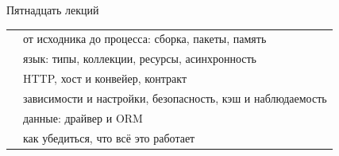 \documentclass[aspectratio=169,10pt,t]{beamer}
\begin{document}
\begin{frame}{Пятнадцать лекций}
  \slidetop

  {\renewcommand{\arraystretch}{1.3}
  \begin{tabular}{@{}L{2.6cm}L{10.2cm}@{}}
       & от исходника до процесса: сборка, пакеты, память \\
       & язык: типы, коллекции, ресурсы, асинхронность \\
       & HTTP, хост и конвейер, контракт \\
     & зависимости и настройки, безопасность, кэш и
      наблюдаемость \\
     & данные: драйвер и ORM \\
          & как убедиться, что всё это работает \\
  \end{tabular}}

  \slidegap
\end{frame}

\begin{frame}[plain]
\end{frame}
\end{document}
